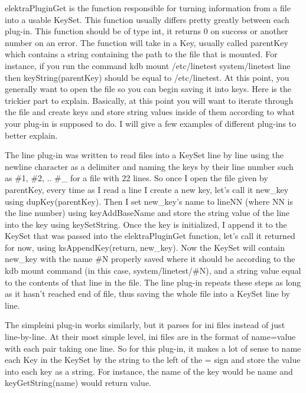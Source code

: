 {\ttfamily elektra\+Plugin\+Get} is the function responsible for turning information from a file into a usable Key\+Set. This function usually differs pretty greatly between each plug-\/in. This function should be of type int, it returns 0 on success or another number on an error. The function will take in a Key, usually called {\ttfamily parent\+Key} which contains a string containing the path to the file that is mounted. For instance, if you run the command {\ttfamily kdb mount /etc/linetest system/linetest line} then {\ttfamily key\+String(parent\+Key)} should be equal to {\ttfamily /etc/linetest}. At this point, you generally want to open the file so you can begin saving it into keys. Here is the trickier part to explain. Basically, at this point you will want to iterate through the file and create keys and store string values inside of them according to what your plug-\/in is supposed to do. I will give a few examples of different plug-\/ins to better explain.

The line plug-\/in was written to read files into a Key\+Set line by line using the newline character as a delimiter and naming the keys by their line number such as {\ttfamily \#1}, {\ttfamily \#2}, .. {\ttfamily \#\+\_} for a file with 22 lines. So once I open the file given by {\ttfamily parent\+Key}, every time as I read a line I create a new key, let's call it new\+\_\+key using dup\+Key(parent\+Key). Then I set new\+\_\+key's name to line\+N\+N (where N\+N is the line number) using {\ttfamily key\+Add\+Base\+Name} and store the string value of the line into the key using {\ttfamily key\+Set\+String}. Once the key is initialized, I append it to the Key\+Set that was passed into the elektra\+Plugin\+Get function, let's call it returned for now, using {\ttfamily ks\+Append\+Key(return, new\+\_\+key)}. Now the Key\+Set will contain {\ttfamily new\+\_\+key} with the name {\ttfamily \#\+N} properly saved where it should be according to the {\ttfamily kdb mount} command (in this case, {\ttfamily system/linetest/\#\+N}), and a string value equal to the contents of that line in the file. The line plug-\/in repeats these steps as long as it hasn't reached end of file, thus saving the whole file into a Key\+Set line by line.

The simpleini plug-\/in works similarly, but it parses for ini files instead of just line-\/by-\/line. At their most simple level, ini files are in the format of {\ttfamily name=value} with each pair taking one line. So for this plug-\/in, it makes a lot of sense to name each Key in the Key\+Set by the string to the left of the {\ttfamily =} sign and store the value into each key as a string. For instance, the name of the key would be {\ttfamily name} and {\ttfamily key\+Get\+String(name)} would return {\ttfamily value}.

